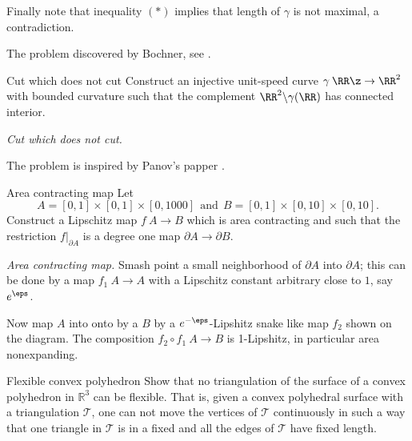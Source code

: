 Finally note that inequality $({*})$ implies that 
length of $\gamma$ is not maximal, a contradiction.

The problem discovered by Bochner, see \cite{bochner}.










\begin{pr}{\easy}{Cut which does not cut}\label{Cut which does not cut}
Construct an injective 
unit-speed curve 
$\gamma\:\RR\z\to\RR^2$ with bounded curvature
such that the complement $\RR^2\backslash\gamma(\RR)$ 
has connected interior.
\end{pr}


\textit{Cut which does not cut.}

 The problem is inspired by Panov's papper \cite{panov-torus}.







\begin{pr}{}{Area contracting map}\label{Area contracting map}
Let 
$$A=[0,1]\times[0,1]\times[0,1000]\ \ \text{and}\ \ B=[0,1]\times[0,10]\times[0,10].$$
Construct a Lipschitz map 
$f\:A\to B$ which is area contracting and such that the restriction $f|_{\partial A}$ 
is a degree one map $\partial A\to \partial B$.
\bigsign{\cite[\ref{guth-area-cnotractin}]{guth}}
\end{pr}


\textit{Area contracting map.}
Smash point 
a small neighborhood of $\partial A$ into $\partial A$;
this can be done by a map $f_1\:A\to A$
with a Lipschitz constant arbitrary close to $1$, say $e^\eps$.

Now map $A$ into onto by a  $B$ by a $e^{-\eps}$-Lipshitz snake like map $f_2$ shown on the diagram.
The composition $f_2\circ f_1\:A\to B$ is 1-Lipshitz, in particular area nonexpanding. 












\begin{pr}{\thm}{Flexible convex polyhedron}\label{Flexible convex polyhedron}
Show that no triangulation of the surface of a convex polyhedron in $\mathbb R^3$ 
can be flexible.
That is, given a convex polyhedral surface with a triangulation $\mathcal T$, one can not move the vertices of $\mathcal T$ continuously in such a way that one triangle in $\mathcal T$ is in a fixed
and 
all the edges of $\mathcal T$ have fixed length.
\end{pr}



